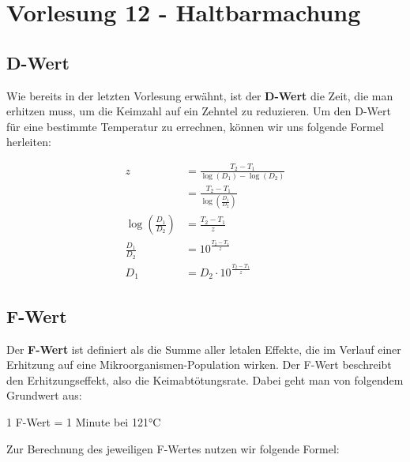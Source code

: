 \documentclass[a4paper,10pt,twoside]{article}
\begin{document}
\pagebreak
\section*{Vorlesung 12 - Haltbarmachung}\addtocounter{section}{1}

\subsection{D-Wert}
Wie bereits in der letzten Vorlesung erwähnt, ist der \textbf{D-Wert} die Zeit, die man erhitzen muss, um die Keimzahl auf ein Zehntel zu reduzieren. Um den D-Wert für eine bestimmte Temperatur zu errechnen, können wir uns folgende Formel herleiten:

\begin{align*}
z &= \frac{T_2 - T_1}{\log(D_1) - \log(D_2)} \\
 &= \frac{T_2 - T_1}{\log(\frac{D_1}{D_2})} \\
\log(\frac{D_1}{D_2}) &= \frac{T_2 - T_1}{z} \\
\frac{D_1}{D_2} &= 10^{\frac{T_2 - T_1}{z}} \\
D_1 &= D_2 \cdot 10^{\frac{T_2 - T_1}{z}} 
\end{align*}




\subsection{F-Wert}
Der \textbf{F-Wert} ist definiert als die Summe aller letalen Effekte, die im Verlauf einer Erhitzung auf eine Mikroorganismen-Population wirken. Der F-Wert beschreibt den Erhitzungseffekt, also die Keimabtötungsrate. Dabei geht man von folgendem Grundwert aus:

\pp
\begin{center}
1 F-Wert = 1 Minute bei 121°C
\end{center}

\pp
Zur Berechnung des jeweiligen F-Wertes nutzen wir folgende Formel:
\end{document}
